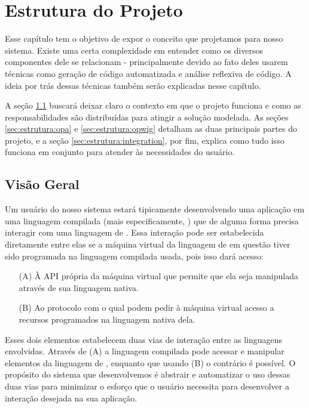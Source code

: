 \chapter{Estrutura do Projeto}
\label{sec:estrutura}

  Esse capítulo tem o objetivo de expor o conceito que projetamos para nosso
  sistema. Existe uma certa complexidade em entender como os diversos
  componentes dele se relacionam - principalmente devido ao fato deles usarem
  técnicas como geração de código automatizada e análise reflexiva de código. A
  ideia por trás dessas técnicas também serão explicadas nesse capítulo.
  
  A seção \ref{sec:estrutura:geral} buscará deixar
  claro o contexto em que o projeto funciona e como as responsabilidades
  são distribuídas para atingir a solução modelada. As seções
  \ref{sec:estrutura:opa} e \ref{sec:estrutura:opwig} detalham as duas
  principais partes do projeto, e a seção \ref{sec:estrutura:integration}, por
  fim, explica como tudo isso funciona em conjunto para atender às necessidades
  do usuário.

  \section{Visão Geral}
  \label{sec:estrutura:geral}
  
    Um usuário do nosso sistema estará tipicamente desenvolvendo uma aplicação
    em uma linguagem compilada (mais especificamente, \CXX{}) que de alguma
    forma precisa interagir com uma linguagem de \script{}. Essa interação pode
    ser estabelecida diretamente entre elas se a máquina virtual da linguagem de
    \script{} em questão tiver sido programada na linguagem compilada usada,
    pois isso dará acesso:
    
    \begin{itemize}
      \item[(A)]
        À API própria da máquina virtual que permite que ela seja manipulada
        através de sua linguagem nativa.
      \item[(B)]
        Ao protocolo com o qual  podem pedir à máquina virtual acesso
        a recursos programados na linguagem nativa dela.
    \end{itemize}

    Esses dois elementos estabelecem duas vias de interação entre as linguagens
    envolvidas. Através de (A) a linguagem compilada pode acessar e manipular
    elementos da linguagem de \script{}, enquanto que usando (B) o contrário é
    possível. O propósito do sistema que desenvolvemos é abstrair e automatizar
    o uso dessas duas vias para minimizar o esforço que o usuário necessita para
    desenvolver a interação desejada na sua aplicação.

